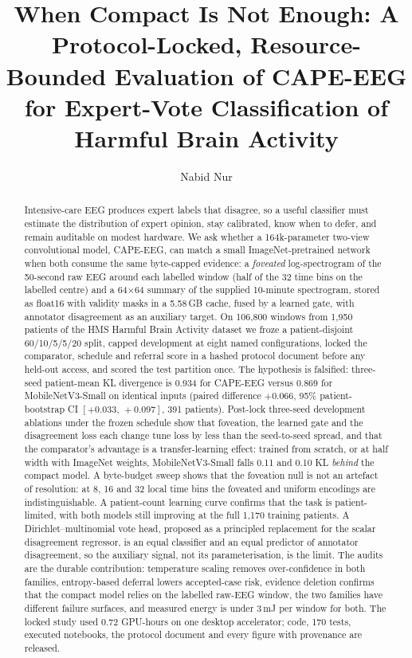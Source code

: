 \documentclass[sigconf,anonymous]{acmart}
\newcommand{\ci}[2]{[#1,\,#2]}
\begin{document}
\title[When Compact Is Not Enough: Protocol-Locked Evaluation of CAPE-EEG]{When Compact Is Not Enough: A Protocol-Locked, Resource-Bounded Evaluation of CAPE-EEG for Expert-Vote Classification of Harmful Brain Activity}

\author{Nabid Nur}
\renewcommand{\shortauthors}{Nur}

\begin{abstract}
Intensive-care EEG produces expert labels that disagree, so a useful classifier must estimate the distribution of expert opinion, stay calibrated, know when to defer, and remain auditable on modest hardware. We ask whether a 164k-parameter two-view convolutional model, CAPE-EEG, can match a small ImageNet-pretrained network when both consume the same byte-capped evidence: a \emph{foveated} log-spectrogram of the 50-second raw EEG around each labelled window (half of the 32 time bins on the labelled centre) and a 64$\times$64 summary of the supplied 10-minute spectrogram, stored as float16 with validity masks in a 5.58\,GB cache, fused by a learned gate, with annotator disagreement as an auxiliary target. On 106,800 windows from 1,950 patients of the HMS Harmful Brain Activity dataset we froze a patient-disjoint 60/10/5/5/20 split, capped development at eight named configurations, locked the comparator, schedule and referral score in a hashed protocol document before any held-out access, and scored the test partition once. The hypothesis is falsified: three-seed patient-mean KL divergence is 0.934 for CAPE-EEG versus 0.869 for MobileNetV3-Small on identical inputs (paired difference $+0.066$, 95\% patient-bootstrap CI $\ci{+0.033}{+0.097}$, 391 patients). Post-lock three-seed development ablations under the frozen schedule show that foveation, the learned gate and the disagreement loss each change tune loss by less than the seed-to-seed spread, and that the comparator's advantage is a transfer-learning effect: trained from scratch, or at half width with ImageNet weights, MobileNetV3-Small falls 0.11 and 0.10 KL \emph{behind} the compact model. A byte-budget sweep shows that the foveation null is not an artefact of resolution: at 8, 16 and 32 local time bins the foveated and uniform encodings are indistinguishable. A patient-count learning curve confirms that the task is patient-limited, with both models still improving at the full 1,170 training patients. A Dirichlet--multinomial vote head, proposed as a principled replacement for the scalar disagreement regressor, is an equal classifier and an equal predictor of annotator disagreement, so the auxiliary signal, not its parameterisation, is the limit. The audits are the durable contribution: temperature scaling removes over-confidence in both families, entropy-based deferral lowers accepted-case risk, evidence deletion confirms that the compact model relies on the labelled raw-EEG window, the two families have different failure surfaces, and measured energy is under 3\,mJ per window for both. The locked study used 0.72 GPU-hours on one desktop accelerator; code, 170 tests, executed notebooks, the protocol document and every figure with provenance are released.
\end{abstract}
\end{document}
